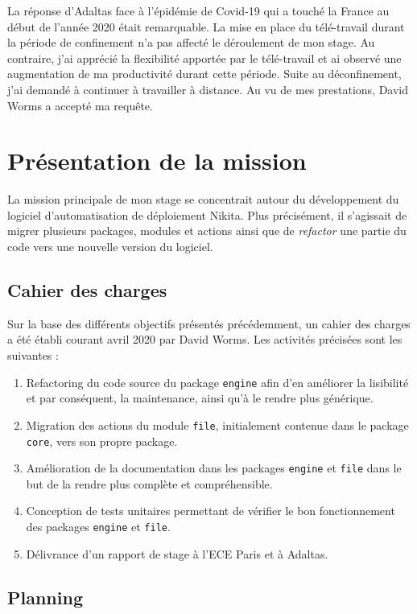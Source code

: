 \documentclass[12pt, french]{report}
\begin{document}
La réponse d'Adaltas face à l'épidémie de Covid-19 qui a touché la France au début de l'année 2020 était remarquable. La mise en place du télé-travail durant la période de confinement n'a pas affecté le déroulement de mon stage. Au contraire, j'ai apprécié la flexibilité apportée par le télé-travail et ai observé une augmentation de ma productivité durant cette période. Suite au déconfinement, j'ai demandé à continuer à travailler à distance. Au vu de mes prestations, David Worms a accepté ma requête.

\chapter{Présentation de la mission}

La mission principale de mon stage se concentrait autour du développement du logiciel d'automatisation de déploiement Nikita. Plus précisément, il s'agissait de migrer plusieurs packages, modules et actions ainsi que de \textit{refactor} une partie du code vers une nouvelle version du logiciel.

\section{Cahier des charges}

Sur la base des différents objectifs présentés précédemment, un cahier des charges a été établi courant avril 2020 par David Worms. Les activités précisées sont les suivantes : 

\begin{enumerate}
  \item Refactoring du code source du package \texttt{engine} afin d'en améliorer la lisibilité et par conséquent, la maintenance, ainsi qu'à le rendre plus générique.
  \item Migration des actions du module \texttt{file}, initialement contenue dans le package \texttt{core}, vers son propre package.
  \item Amélioration de la documentation dans les packages \texttt{engine} et \texttt{file} dans le but de la rendre plus complète et compréhensible.
  \item Conception de tests unitaires permettant de vérifier le bon fonctionnement des packages \texttt{engine} et \texttt{file}.
  \item Délivrance d'un rapport de stage à l'ECE Paris et à Adaltas.
\end{enumerate}

\section{Planning}
\end{document}

